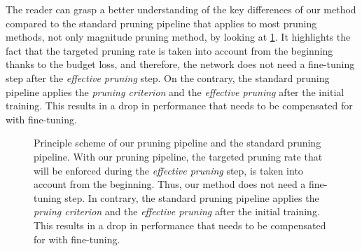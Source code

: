 The reader can grasp a better understanding of the key differences of our method
compared to the standard pruning pipeline that applies to most pruning methods,
not only magnitude pruning method, by looking at
\cref{fig:chap1:pruning_pipeline_comparison}. It highlights the fact that the
targeted pruning rate is taken into account from the beginning thanks to the
budget loss, and therefore, the network does not need a fine-tuning step after
the \emph{effective pruning} step. On the contrary, the standard pruning
pipeline applies the \emph{pruning criterion} and the \emph{effective pruning}
after the initial training. This results in a drop in performance that needs to
be compensated for with fine-tuning. \\

\begin{figure}
  \centering
  \caption{ Principle scheme of our pruning pipeline and the standard
    pruning pipeline. With our pruning pipeline, the targeted pruning rate that will
    be enforced during the \emph{effective pruning} step, is taken into account
    from the beginning. Thus, our method does not need a fine-tuning step. In
    contrary, the standard pruning pipeline applies the \emph{pruing criterion}
    and the \emph{effective pruning} after the initial training. This results in a
    drop in performance that needs to be compensated for with fine-tuning.}
  \label{fig:chap1:pruning_pipeline_comparison}
\end{figure}

